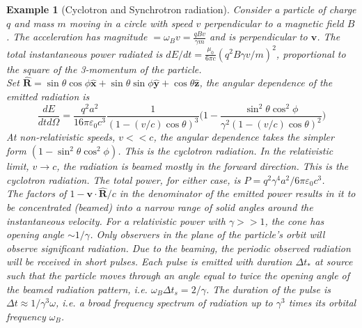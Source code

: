 \documentclass[a4paper]{article}
\newtheorem{eg}{Example}[section]
\theoremstyle{new}
\begin{document}
\begin{eg}[Cyclotron and Synchrotron radiation]
Consider a particle of charge $q$ and mass $m$ moving in a circle with speed $v$ perpendicular to a magnetic field $B$. The acceleration has magnitude $=\omega_Bv=\frac{qBv}{\gamma m}$ and is perpendicular to $\mathbf{v}$. The total instantaneous power radiated is $dE/dt=\frac{\mu_0}{6\pi c}(q^2B\gamma v/m)^2$, proportional to the square of the 3-momentum of the particle.\\[5pt]
Set $\mathbf{\hat{R}}=\sin\theta\cos\phi\mathbf{\hat{x}}+\sin\theta\sin\phi\mathbf{\hat{y}}+\cos\theta\mathbf{\hat{z}}$, the angular dependence of the emitted radiation is
$$\frac{dE}{dtd\Omega}=\frac{q^2a^2}{16\pi\varepsilon_0c^3}\frac{1}{(1-(v/c)\cos\theta)^3}\bigg(1-\frac{\sin^2\theta\cos^2\phi}{\gamma^2(1-(v/c)\cos\theta)^2}\bigg)$$
At non-relativistic speeds, $v<<c$, the angular dependence takes the simpler form $(1-\sin^2\theta\cos^2\phi)$. This is the cyclotron radiation. In the relativistic limit, $v\rightarrow c$, the radiation is beamed mostly in the forward direction. This is the cyclotron radiation. The total power, for either case, is $P=q^2\gamma^4a^2/6\pi\varepsilon_0c^3$.\\[5pt]
The factors of $1-\mathbf{v}\cdot\mathbf{\hat{R}}/c$ in the denominator of the emitted power results in it to be concentrated (beamed) into a narrow range of solid angles around the instantaneous velocity. For a relativistic power with $\gamma>>1$, the cone has opening angle $\sim1/\gamma$. Only observers in the plane of the particle's orbit will observe significant radiation. Due to the beaming, the periodic observed radiation will be received in short pulses. Each pulse is emitted with duration $\Delta t_*$ at source such that the particle moves through an angle equal to twice the opening angle of the beamed radiation pattern, i.e. $\omega_B\Delta t_s=2/\gamma$. The duration of the pulse is $\Delta t\approx1/\gamma^3\omega$, i.e. a broad frequency spectrum of radiation up to $\gamma^3$ times its orbital frequency $\omega_B$.
\end{eg}
\newpage
\end{document}
